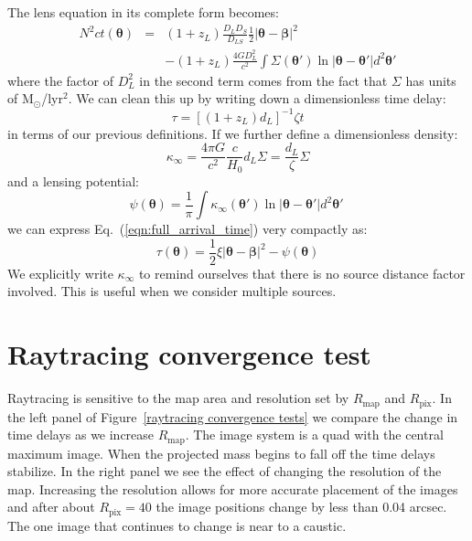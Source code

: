 \documentclass[galley,usenatbib]{mn2e}
\newcommand{\Rmap}{\ensuremath{R_\mathrm{map}}}
\newcommand{\Rpix}{\ensuremath{R_\mathrm{pix}}}
\newcommand{\Msun}{\ensuremath{\mathrm{M}_\odot}}
\newcommand{\figref}[1] {Figure~\ref{#1}}
\newcommand{\eqnref}[1] {Eq.~(\ref{#1})}
\renewcommand{\vec}[1]{\ensuremath{\boldsymbol{#1}}}
\begin{document}
The lens equation in its complete form becomes:
%
\begin{eqnarray}
N^2ct(\vec\theta) & = & (1+z_L)\frac{D_{L}D_{S}}{D_{LS}}\frac12 |\vec\theta - \vec\beta|^2 \nonumber \\
& & - (1+z_L)\frac{4GD_{L}^2}{c^2}\int \Sigma(\vec\theta') \ln |\vec\theta-\vec\theta'| d^2\vec\theta'
\label{eqn:full_arrival_time}
\end{eqnarray}
%
where the factor of $D_L^2$ in the second term comes from the fact that $\Sigma$
has units of \Msun/lyr$^2$. We can clean this up by writing down a dimensionless time
delay:
%
\begin{equation}
\tau = \left[ (1+z_L) d_L\right]^{-1}\zeta t
\label{tau}
\end{equation}
%
in terms of our previous definitions. If we
further define a dimensionless density:
%
\begin{equation}
\kappa_\infty = \frac{4\pi G}{c^2}\frac{c}{H_0}d_L\Sigma
              = \frac{d_L}{\zeta}\Sigma
\end{equation}
%
and a lensing potential:
%
\begin{equation}
\psi(\vec\theta) = \frac1\pi \int \kappa_\infty(\vec\theta') \ln|\vec\theta - \vec\theta'| d^2\vec\theta'\
\label{lensing potential}
\end{equation}
%
we can express \eqnref{eqn:full_arrival_time} very compactly as:
%
\begin{equation}
\tau(\vec\theta) = \frac12 \xi |\vec\theta-\vec\beta|^2 - \psi(\vec\theta)
\label{arrival time}
\end{equation}
We explicitly write $\kappa_\infty$ to remind ourselves
that there is no source distance factor involved. This is useful when we
consider multiple sources.

\section{Raytracing convergence test}
Raytracing is sensitive to the map area and resolution set by $\Rmap$ and
$\Rpix$.  In the left panel of \figref{raytracing convergence tests} we compare
the change in time delays as we increase $\Rmap$.  The image system is a quad
with the central maximum image. When the projected mass begins to fall off the
time delays stabilize. In the right panel we see the effect of changing the
resolution of the map.  Increasing the resolution allows for more accurate
placement of the images and after about $\Rpix=40$ the image positions change
by less than 0.04 arcsec. The one image that continues to change is near to a
caustic.  
\end{document}
